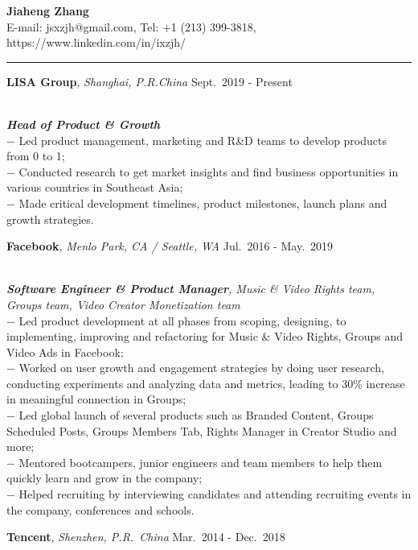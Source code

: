 \documentclass[a4paper,10pt]{article}
\newcommand{\shadedsection}[1]{
    \setlength{\fboxsep}{0pt}
    \colorbox{shadecolor}{%
        \begin{minipage}{\linewidth}%
            \vspace{0.2em}%
            #1%
        \end{minipage}%
    }
}
\newenvironment{rSection}[1]{ %
  \medskip
  \hspace{-1.5em}{\color{Blue}\MakeUppercase{\large \bf {#1}}} %
  \vspace{-0.2em}
  \medskip
  \hrule %
  \begin{list}{}{ %
    \setlength{\leftmargin}{1.5em} %
  }
\setlength{\itemsep}{1pt}
  \item[]
}{
  \end{list}
}
\newcommand{\detail}[1]{{$-$ {#1}}}
\newcommand{\period}[3]{\normalsize {#1} \hfill {#2} - {#3}}
\begin{document}
\begin{center}
  {\huge \bf \color{Blue} Jiaheng Zhang}\\
  \medskip
  {E-mail: jsxzjh@gmail.com, Tel: +1 (213) 399-3818, https://www.linkedin.com/in/ixzjh/}
\end{center}

\begin{rSection}{Experience}
  \vspace{-1.5em}
  \item
	\shadedsection{\period{{\bf LISA Group}, {\em Shanghai, P.R.China}}{Sept.~2019}{Present}}\\
	{\em {\bf Head of Product \& Growth}}\\
	\detail{Led product management, marketing and R\&D teams to develop products from 0 to 1;}\\
	\detail{Conducted research to get market insights and find business opportunities in various countries in Southeast Asia;}\\
	\detail{Made critical development timelines, product milestones, launch plans and growth strategies.}
  \item
    \shadedsection{\period{{\bf Facebook}, {\em Menlo Park, CA / Seattle, WA}}{Jul.~2016}{May.~2019}}\\
    {\em {\bf Software Engineer \& Product Manager}, Music \& Video Rights team, Groups team, Video Creator Monetization team}\\
    \detail{Led product development at all phases from scoping, designing, to implementing, improving and refactoring for Music \& Video Rights, Groups and Video Ads in Facebook;}\\
    \detail{Worked on user growth and engagement strategies by doing user research, conducting experiments and analyzing data and metrics, leading to 30\% increase in meaningful connection in Groups;}\\
    \detail{Led global launch of several products such as Branded Content, Groups Scheduled Posts, Groups Members Tab, Rights Manager in Creator Studio and more;}\\
    \detail{Mentored bootcampers, junior engineers and team members to help them quickly learn and grow in the company;}\\
    \detail{Helped recruiting by interviewing candidates and attending recruiting events in the company, conferences and schools.}
  \item
    \shadedsection{\period{{\bf Tencent}, {\em Shenzhen, P.R.~China}}{Mar.~2014}{Dec.~2018}}\\

\end{rSection}
\end{document}
